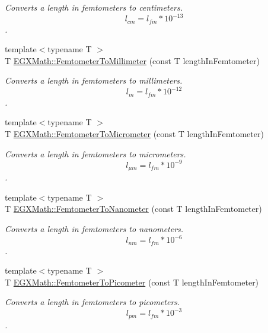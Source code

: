\begin{DoxyCompactItemize}
\begin{DoxyCompactList}\small\item\em Converts a length in femtometers to centimeters. \[ l_{cm}=l_{fm} * 10^{-13} \]. \end{DoxyCompactList}\item 
{\footnotesize template$<$typename T $>$ }\\T \mbox{\hyperlink{group___e_g_x_math-_conversions-_length_conversions-_femtometer-_s_i_ga2e6d6c0aad4502554b05f677ff248bc8}{E\+G\+X\+Math\+::\+Femtometer\+To\+Millimeter}} (const T length\+In\+Femtometer)
\begin{DoxyCompactList}\small\item\em Converts a length in femtometers to millimeters. \[ l_{m}=l_{fm} * 10^{-12} \]. \end{DoxyCompactList}\item 
{\footnotesize template$<$typename T $>$ }\\T \mbox{\hyperlink{group___e_g_x_math-_conversions-_length_conversions-_femtometer-_s_i_gac965667884f7a3449072effb83260fe8}{E\+G\+X\+Math\+::\+Femtometer\+To\+Micrometer}} (const T length\+In\+Femtometer)
\begin{DoxyCompactList}\small\item\em Converts a length in femtometers to micrometers. \[ l_{\mu m}=l_{fm} * 10^{-9} \]. \end{DoxyCompactList}\item 
{\footnotesize template$<$typename T $>$ }\\T \mbox{\hyperlink{group___e_g_x_math-_conversions-_length_conversions-_femtometer-_s_i_ga61aa82ad734717567c959f0d4e840076}{E\+G\+X\+Math\+::\+Femtometer\+To\+Nanometer}} (const T length\+In\+Femtometer)
\begin{DoxyCompactList}\small\item\em Converts a length in femtometers to nanometers. \[ l_{nm}=l_{fm} * 10^{-6} \]. \end{DoxyCompactList}\item 
{\footnotesize template$<$typename T $>$ }\\T \mbox{\hyperlink{group___e_g_x_math-_conversions-_length_conversions-_femtometer-_s_i_gadfcd6b374d4134cad0ac1ce7a8e50509}{E\+G\+X\+Math\+::\+Femtometer\+To\+Picometer}} (const T length\+In\+Femtometer)
\begin{DoxyCompactList}\small\item\em Converts a length in femtometers to picometers. \[ l_{pm}=l_{fm} * 10^{-3} \]. \end{DoxyCompactList}\item 

\end{DoxyCompactItemize}
